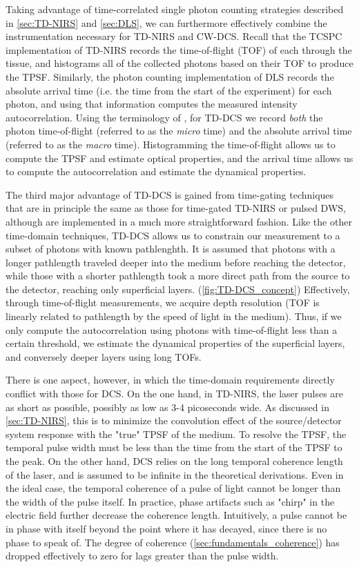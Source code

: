 Taking advantage of time-correlated single photon counting strategies described in \autoref{sec:TD-NIRS} and \autoref{sec:DLS}, we can furthermore effectively combine the instrumentation necessary for TD-NIRS and CW-DCS. Recall that the TCSPC implementation of TD-NIRS records the time-of-flight (TOF) of each through the tissue, and histograms all of the collected photons based on their TOF to produce the TPSF. Similarly, the photon counting implementation of DLS records the absolute arrival time (i.e. the time from the start of the experiment) for each photon, and using that information computes the measured intensity autocorrelation. Using the terminology of \cite{Becker2014}, for TD-DCS we record \emph{both} the photon time-of-flight (referred to as the \emph{micro} time) and the absolute arrival time (referred to as the \emph{macro} time). Histogramming the time-of-flight allows us to compute the TPSF and estimate optical properties, and the arrival time allows us to compute the autocorrelation and estimate the dynamical properties.

The third major advantage of TD-DCS is gained from time-gating techniques that are in principle the same as those for time-gated TD-NIRS or pulsed DWS, although are implemented in a much more straightforward fashion. Like the other time-domain techniques, TD-DCS allows us to constrain our measurement to a subset of photons with known pathlenghth. It is assumed that photons with a longer pathlength traveled deeper into the medium before reaching the detector, while those with a shorter pathlength took a more direct path from the source to the detector, reaching only superficial layers. (\autoref{fig:TD-DCS_concept}) Effectively, through time-of-flight measurements, we acquire depth resolution (TOF is linearly related to pathlength by the speed of light in the medium). Thus, if we only compute the autocorrelation using photons with time-of-flight less than a certain threshold, we estimate the dynamical properties of the superficial layers, and conversely deeper layers using long TOFs.

There is one aspect, however, in which the time-domain requirements directly conflict with those for DCS. On the one hand, in TD-NIRS, the laser pulses are as short as possible, possibly as low as 3-4 picoseconds wide. As discussed in \autoref{sec:TD-NIRS}, this is to minimize the convolution effect of the source/detector system response with the "true" TPSF of the medium. To resolve the TPSF, the temporal pulse width must be less than the time from the start of the TPSF to the peak. On the other hand, DCS relies on the long temporal coherence length of the laser, and is assumed to be infinite in the theoretical derivations. Even in the ideal case, the temporal coherence of a pulse of light cannot be longer than the width of the pulse itself. In practice, phase artifacts such as "chirp" in the electric field further decrease the coherence length. Intuitively, a pulse cannot be in phase with itself beyond the point where it has decayed, since there is no phase to speak of. The degree of coherence (\autoref{sec:fundamentals_coherence}) has dropped effectively to zero for lags greater than the pulse width. 

